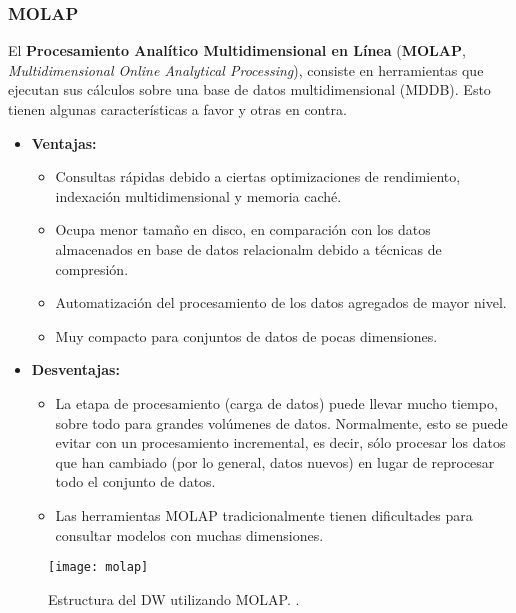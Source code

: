 \documentclass[a4paper,11pt]{article}
\begin{document}
    \subsubsection{MOLAP}
    
    El \textbf{Procesamiento Analítico Multidimensional en Línea} (\textbf{MOLAP}, \textit{Multidimensional Online Analytical Processing}),
    consiste en herramientas que ejecutan sus cálculos sobre una base de datos multidimensional (MDDB). Esto tienen algunas características a favor y otras en contra.
    
    \begin{itemize}
      \item \textbf{Ventajas:}
        \begin{itemize}
          \item Consultas rápidas debido a ciertas optimizaciones de rendimiento, indexación multidimensional y memoria caché.
          \item Ocupa menor tamaño en disco, en comparación con los datos almacenados en base de datos relacionalm debido a técnicas de compresión.
          \item Automatización del procesamiento de los datos agregados de mayor nivel.
          \item Muy compacto para conjuntos de datos de pocas dimensiones.
        \end{itemize}
      \item \textbf{Desventajas:}
        \begin{itemize}
          \item La etapa de procesamiento (carga de datos) puede llevar mucho tiempo, sobre todo para grandes volúmenes de datos. Normalmente, esto se
          puede evitar con un procesamiento incremental, es decir, sólo procesar los datos que han cambiado (por lo general, datos nuevos) en lugar de
          reprocesar todo el conjunto de datos.
          \item Las herramientas MOLAP tradicionalmente tienen dificultades para consultar modelos con muchas dimensiones.
        \end{itemize}
    \end{itemize} 
    
    \begin{figure}
      \begin{center}
        \texttt{[image: molap]}
        \caption{Estructura del DW utilizando MOLAP. \cite[p.~81]{nagabhushana}.}
        \label{molap}
      \end{center}
    \end{figure}
    
\end{document}
